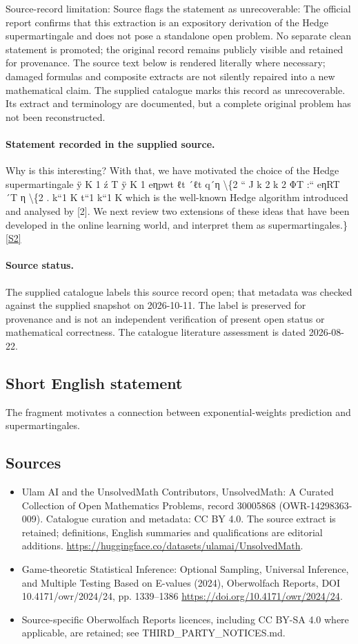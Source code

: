 \documentclass[11pt]{article}
\begin{document}
Source-record limitation: Source flags the statement as unrecoverable: The official report confirms that this extraction is an expository derivation of the Hedge supermartingale and does not pose a standalone open problem. No separate clean statement is promoted; the original record remains publicly visible and retained for provenance.
The source text below is rendered literally where necessary; damaged formulas and composite extracts are not silently repaired into a new mathematical claim.
The supplied catalogue marks this record as unrecoverable. Its extract and terminology are documented, but a complete original problem has not been reconstructed.
\paragraph{Statement recorded in the supplied source.}
Why is this interesting? With that, we have motivated the choice of the Hedge supermartingale ÿ K 1 ź T ÿ K 1 eηpwt ℓt ´ℓt q´η \textbackslash{}\{2 “ J k 2 k 2 ΦT :“ eηRT ´T η \textbackslash{}\{2 . k“1 K t“1 k“1 K which is the well-known Hedge algorithm introduced and analysed by [2]. We next review two extensions of these ideas that have been developed in the online learning world, and interpret them as supermartingales.\} \href{https://doi.org/10.4171/owr/2024/24}{[S2]}
\paragraph{Source status.}
The supplied catalogue labels this source record open; that metadata was checked against the supplied snapshot on 2026-10-11. The label is preserved for provenance and is not an independent verification of present open status or mathematical correctness. The catalogue literature assessment is dated 2026-08-22.
\subsection{Short English statement}
The fragment motivates a connection between exponential-weights prediction and supermartingales.
\subsection{Sources}
\begin{itemize}
\item[S1] Ulam AI and the UnsolvedMath Contributors, UnsolvedMath: A Curated Collection of Open Mathematics Problems, record 30005868 (OWR-14298363-009). Catalogue curation and metadata: CC BY 4.0. The source extract is retained; definitions, English summaries and qualifications are editorial additions.
\url{https://huggingface.co/datasets/ulamai/UnsolvedMath}.
\item[S2] Game-theoretic Statistical Inference: Optional Sampling, Universal Inference, and Multiple Testing Based on E-values (2024), Oberwolfach Reports, DOI 10.4171/owr/2024/24, pp. 1339--1386
\url{https://doi.org/10.4171/owr/2024/24}.
\item Source-specific Oberwolfach Reports licences, including CC BY-SA 4.0 where applicable, are retained; see THIRD\_PARTY\_NOTICES.md.
\end{itemize}
\end{document}
